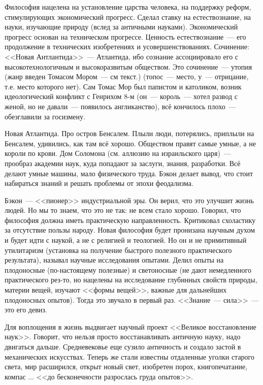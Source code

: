 Философия нацелена на установление царства человека, на поддержку реформ, стимулирующих экономический прогресс. Сделал ставку на естествознание, на науки, изучающие природу (вслед за античными науками). Экономический прогресс основан на техническом прогрессе. Ценность естествознание~--- его продолжение в технических изобретениях и усовершенствованиях. Сочинение: <<Новая Антлантида>>~--- Атлантида, ибо сознание ассоциировало его с высокотехнологичным и высокоразвитым обществом. Это сочинение~--- утопия (жанр введен Томасом Мором~--- см текст.) (топос~--- место, у~--- отрицание, т.е. место которого нет). Сам Томас Мор был папистом и католиком, возник идеологический конфликт с Генрихом 8-м (он~--- король~--- хотел развод с женой, но не давали~--- появилось англиканство), всё кончилось плохо~--- обезглавили за госизмену.

Новая Атлантида. Про остров Бенсалем. Плыли люди, потерялись, приплыли на Бенсалем, удивились, как там всё хорошо. Обществом правят самые умные, а не короли по крови. Дом Соломона (см. аллюзию на израильского царя)~--- прообраз академии наук, куда попадают за заслуги, знания, разработки. Всё делают умные машины, мало физического труда. Бэкон делает вывод, что стоит набираться знаний и решать проблемы от эпохи феодализма. 

Бэкон~--- <<пионер>> индустриальной эры. Он верил, что это улучшит жизнь людей. Но мы то знаем, что это не так: не всем стало хорошо.
Говорил, что философия должна иметь практическую направленность. Критиковал схоластику за отсутствие пользы народу. Новая философия будет пронизана научным духом и будет идти с наукой, а не с религией и теологией. Но он и не примитивный утилитаризм (установка на получение быстрого полезного практического результата), называл научные исследования опытами. Делил опыты на плодоносные (по-настоящему полезные) и светоносные (не дают немедленного практического рез-то, но нацелены на исследование глубинных свойств природы, материи вещей, изучают <<формы вещей>>, важные для дальнейших плодоносных опытов). Тогда это звучало в первый раз. <<Знание~--- сила>>~--- это его девиз.  

Для воплощения в жизнь выдвигает научный проект <<Великое восстановление наук>>. Говорит, что нельзя просто восстанавливать античную науку, надо двигаться дальше. Средневековье еще сузило античность и создало застой в механических искусствах. Теперь же стали известны отдаленные уголки старого света, мир расширился, открыт новый свет, изобретен порох, книгопечатание, компас ... <<до бесконечности разрослась груда опытов>>.

